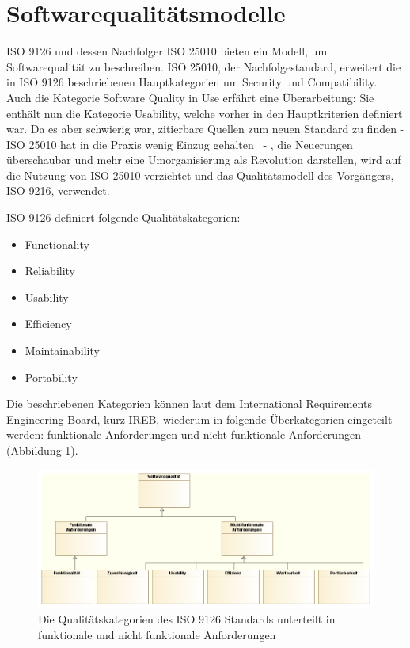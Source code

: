 \section{Softwarequalitätsmodelle}
ISO 9126 \cite{ISO_SQ} und dessen Nachfolger ISO 25010 \cite{ISO_SQ2} bieten ein Modell, um Softwarequalität zu beschreiben. ISO 25010, der Nachfolgestandard, erweitert die in ISO 9126 beschriebenen Hauptkategorien um Security und Compatibility. Auch die Kategorie Software Quality in Use erfährt eine Überarbeitung: Sie enthält nun die Kategorie Usability, welche vorher in den Hauptkriterien definiert war. Da es aber schwierig war, zitierbare Quellen zum neuen Standard zu finden - ISO 25010 hat \glqq in die Praxis wenig Einzug gehalten\grqq \ \cite[S. 60]{effektiv} - , die Neuerungen überschaubar und mehr eine Umorganisierung als Revolution darstellen, wird auf die Nutzung von ISO 25010 verzichtet und das Qualitätsmodell des Vorgängers, ISO 9216, verwendet.

ISO 9126 definiert folgende Qualitätskategorien:

\begin{itemize}
  \item \glqq Functionality\grqq
  \item \glqq Reliability\grqq
  \item \glqq Usability\grqq
  \item \glqq Efficiency\grqq
  \item \glqq Maintainability\grqq
  \item \glqq Portability\grqq
\end{itemize}


Die beschriebenen Kategorien können laut dem International Requirements Engineering Board, kurz IREB, wiederum in folgende Überkategorien eingeteilt werden: funktionale Anforderungen und nicht funktionale Anforderungen (Abbildung \ref{fig:iso9126}).

\begin{figure}[H]
    \centering
    \includegraphics[scale=0.48]{img/iso9126.png}
    \caption{Die Qualitätskategorien des ISO 9126 Standards unterteilt in funktionale und nicht funktionale Anforderungen}
    \label{fig:iso9126}
\end{figure}


